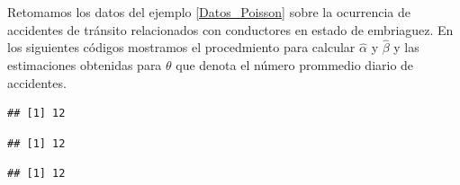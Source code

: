 \begin{Eje}
Retomamos los datos del ejemplo \ref{Datos_Poisson} sobre la ocurrencia de accidentes de tránsito relacionados con conductores en estado de embriaguez. En los siguientes códigos mostramos el procedmiento para calcular $\hat{\alpha}$ y $\hat{\beta}$ y las estimaciones obtenidas para $\theta$ que denota el número prommedio diario de accidentes. 
\begin{knitrout}
\color{fgcolor}\begin{kframe}
\begin{alltt}
 \hlkwb{<-} \hlstd{(}\hlstd{,} \hlstd{,} \hlstd{,} \hlstd{,} \hlstd{,} \hlstd{,} \hlstd{,} \hlstd{,} \hlstd{,} \hlstd{,} \hlstd{,} \hlstd{,} \hlstd{,} \hlstd{,} \hlstd{,} \hlstd{,} \hlstd{,} \hlstd{,} \hlstd{,} \hlstd{,}
           \hlstd{,} \hlstd{,} \hlstd{,} \hlstd{,} \hlstd{,} \hlstd{,} \hlstd{,} \hlstd{,} \hlstd{,}  \hlstd{)}
 \hlkwb{<-}  \hlkwb{<-}  \hlkwb{<-} 
 \hlkwb{<-} \hlopt{/}\hlopt{-}
 \hlkwb{<-} \hlopt{*}
\hlopt{/}
\end{alltt}
\begin{verbatim}
## [1] 12
\end{verbatim}
\begin{alltt}
\hlstd{(}\hlopt{+}\hlopt{/}\hlopt{+}
\end{alltt}
\begin{verbatim}
## [1] 12
\end{verbatim}
\begin{alltt}
\end{alltt}
\begin{verbatim}
## [1] 12
\end{verbatim}
\begin{alltt}
\hlstd{(}\hlstd{(}\hlstd{,}\hlstd{),} \hlstd{=}\hlopt{+} \hlopt{+}

\end{alltt}
\end{kframe}
\end{knitrout}
\end{Eje}
